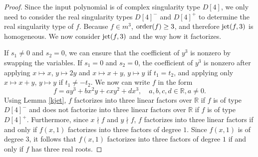 \documentclass{amsproc}
\begin{document}
\begin{proof}
Since the input polynomial is of complex singularity type $D[4]$, we only need
to consider the real singularity types $D[4]^-$ and $D[4]^+$ to determine the
real singularity type of $f$. Because $f\in m^3$, $\textnormal{order}(f)\ge3$,
and therefore $\textnormal{jet}(f,3)$ is homogeneous. We now consider
$\textnormal{jet}(f,3)$ and the way how it factorizes.

If $s_1\neq 0$ and $s_2=0$, we can ensure that the coefficient of $y^3$ is nonzero by swapping the variables. If $s_1=0$ and $s_2=0$, the coefficient of $y^3$ is nonzero after applying $x\mapsto x$, $y\mapsto 2y$ and $x\mapsto x+y$, $y\mapsto y$ if $t_1=t_2$, and applying only $x\mapsto x+y$, $y\mapsto y$ if $t_1\neq -t_2$. We now can write $f$ in the form
\begin{equation*}
f=ay^3+bx^2y+cxy^2+dx^3,\quad a,b,c,d\in\mathbb R, a\neq 0.
\end{equation*}
Using Lemma \ref{kjet}, $f$ factorizes into three linear factors over
$\mathbb R$ if $f$ is of type $D[4]^-$ and does not factorize into three linear
factors over $\mathbb R$ if $f$ is of type $D[4]^+$. Furthermore, since $x\nmid
f$ and $y\nmid f$, $f$ factorizes into three linear factors if and only if
$f(x,1)$ factorizes into three factors of degree $1$. Since $f(x,1)$ is of
degree $3$, it follows that $f(x,1)$ factorizes into three factors of degree $1$
if and only if $f$ has three real roots.


\end{proof}
\end{document}
